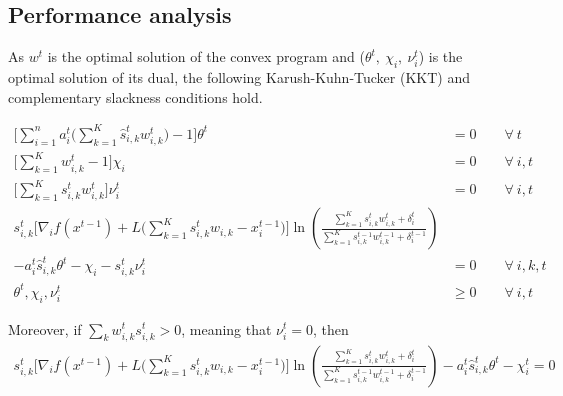 \subsection{Performance analysis}
As $w^{t}$ is the optimal solution of the convex program and ($\theta^t,\ \chi_{i},\ \nu_{i}^{t}$) is the optimal solution of its dual, the following Karush-Kuhn-Tucker (KKT) and complementary slackness conditions hold.

\begin{align*}
   \biggl[ \sum_{i=1}^{n} a_{i}^{t} \biggl( \sum_{k=1}^{K}  \hat{s}_{i,k}^{t} w_{i,k}^{t} \biggr) - 1 \biggr] \theta^{t} &= 0 \qquad \forall \ t \\
   \biggl[ \sum_{k=1}^{K}  w_{i,k}^{t}  - 1 \biggr] \chi_{i} &= 0 \qquad \forall\ i, t \\
   \biggl[ \sum_{k=1}^{K}  s_{i,k}^{t} w_{i,k}^{t} \biggr] \nu_{i}^{t} &= 0 \qquad \forall\ i, t \\
%
 s_{i,k}^{t} \biggl[  \nabla_{i} f(x^{t-1}) + L\biggl( \sum_{k=1}^{K} s_{i,k}^{t} w_{i,k}  - x_{i}^{t-1} \biggr) \biggr] \ln \left( \frac{\sum_{k=1}^{K} s_{i,k}^{t} w_{i,k}^{t} + \delta_{i}^{t}}{\sum_{k=1}^{K}  s_{i,k}^{t-1}w_{i,k}^{t-1}  + \delta_{i}^{t-1}} \right) \\
        - a_{i}^{t} \hat{s}_{i,k}^{t} \theta^{t} - \chi_{i} - s_{i,k}^{t} \nu_{i}^{t} &= 0	\qquad \forall\ i,k,t \\
    \theta^{t}, \chi_{i}, \nu_{i}^{t} &\geq 0 \qquad \forall\ i, t
\end{align*}

Moreover, if $\sum_{k} w_{i,k}^{t} s_{i,k}^{t} > 0$, meaning that $\nu_{i}^{t} = 0$, then
\begin{align}	\label{eq:KKT2}
 s_{i,k}^{t} \biggl[  \nabla_{i} f(x^{t-1}) + L\biggl( \sum_{k=1}^{K} s_{i,k}^{t} w_{i,k}  - x_{i}^{t-1} \biggr) \biggr] \ln \left( \frac{\sum_{k=1}^{K} s_{i,k}^{t} w_{i,k}^{t} + \delta_{i}^{t}}{\sum_{k=1}^{K}  s_{i,k}^{t-1}w_{i,k}^{t-1}  + \delta_{i}^{t-1}} \right)
        - a_{i}^{t} \hat{s}_{i,k}^{t} \theta^{t} - \chi_{i}^{t} = 0
\end{align}


